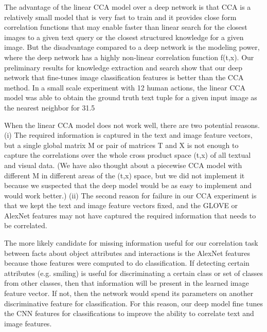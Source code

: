 \documentclass[runningheads]{llncs}
\begin{document}
The advantage of the linear CCA model over a deep network is that CCA is a relatively small model that is very fast to train and it provides close form correlation functions that may enable faster than linear search for the closest images to a given text query or the closest structured knowledge for a given image. But the disadvantage compared to a deep network is the modeling power, where the deep network has a highly non-linear correlation function f(t,x). Our preliminary results for knowledge extraction and search show that our deep network that fine-tunes image classification features is better than the CCA method. In a small scale experiment with 12 human actions, the linear CCA model was able to obtain the ground truth text tuple for a given input image as the nearest neighbor for 31.5%

When the linear CCA model does not work well, there are two potential reasons. (i) The required information is captured in the text and image feature vectors, but a single global matrix M or pair of matrices T and X is not enough to capture the correlations over the whole cross product space (t,x) of all textual and visual data. (We have also thought about a piecewise CCA model with different M in different areas of the (t,x) space, but we did not implement it because we suspected that the deep model would be as easy to implement and would work better.) (ii) The second reason for failure in our CCA experiment is that we kept the text and image feature vectors fixed, and the GLOVE or AlexNet features may not have captured the required information that needs to be correlated. 

The more likely candidate for missing information useful for our correlation task between facts about object attributes and interactions is the AlexNet features because those features were computed to do classification. If detecting certain attributes (e.g. smiling) is useful for discriminating a certain class or set of classes from other classes, then that information will be present in the learned image feature vector. If not, then the network would spend its parameters on another discriminative feature for classification. For this reason, our deep model fine tunes the CNN features for classifications to improve the ability to correlate text and image features.
\end{document}

